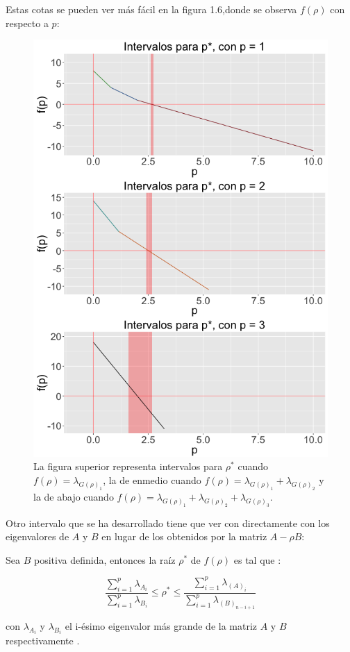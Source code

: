 \begin{example}
 Estas cotas se pueden ver más fácil en la figura 1.6,donde se observa $f(\rho)$ con respecto a $p$:

\begin{figure}[!ht] \label{Fig1.6}
  \centering
  \includegraphics[width=.9\textwidth]{Figures/Chapter2_grid3eigen_interv}  
  \caption[Intervalos para $\rho^*$.] {La figura superior representa intervalos para $\rho^*$ cuando $f(\rho) = \lambda_{G(\rho)_1}$, la de enmedio cuando $f(\rho) = \lambda_{G(\rho)_1} + \lambda_{G(\rho)_2}$ y la de abajo cuando $f(\rho) = \lambda_{G(\rho)_1} + \lambda_{G(\rho)_2} + \lambda_{G(\rho)_3}$.}
\end{figure}

\end{example}

Otro intervalo que se ha desarrollado tiene que ver con directamente con los eigenvalores de $A$ y $B$ en lugar de los obtenidos por la matriz $A-\rho B$:

\pagebreak
\begin{proposition}
Sea $B$ positiva definida, entonces la raíz $\rho^*$ de $f(\rho)$ es tal que \cite{ngo2012trace}:

\begin{equation*}
\frac{\sum_{i = 1}^{p}\lambda_{A_i}}{\sum_{i = 1}^{p}\lambda_{B_i}} \leq \rho^* \leq \frac{\sum_{i = 1}^{p}\lambda_{(A)_i}}{\sum_{i = 1}^{p}\lambda_{(B)_{n-i+1}}}	
\end{equation*}

con $\lambda_{A_i}$ y $\lambda_{B_i}$ el i-ésimo eigenvalor más grande  de la matriz $A$ y $B$ respectivamente \cite{ngo2012trace}. 
\end{proposition}


